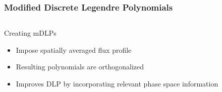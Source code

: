 \documentclass[fleqn]{beamer}
\begin{document}
    \begin{frame}
        \frametitle{Modified Discrete Legendre Polynomials}
        \begin{columns}[T]
            \begin{column}{0.4\textwidth}
                \begin{block}{Creating mDLPs}
                    \begin{itemize}
                        \item Impose spatially averaged flux profile
                        \item Resulting polynomials are orthogonalized
                        \item Improves DLP by incorporating relevant phase
                        space
                        information
                    \end{itemize}
                \end{block}
            \end{column}
            \begin{column}{0.6\textwidth}
                \centering


\end{column}
\end{columns}
\end{frame}
\end{document}
